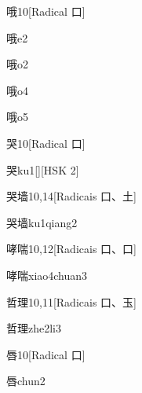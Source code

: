 \begin{entry}{哦}{10}[Radical ⼝]
  \begin{phonetics}{哦}{e2}
  \end{phonetics}
  \begin{phonetics}{哦}{o2}
  \end{phonetics}
  \begin{phonetics}{哦}{o4}
  \end{phonetics}
  \begin{phonetics}{哦}{o5}
  \end{phonetics}
\end{entry}

\begin{entry}{哭}{10}[Radical ⼝]
  \begin{phonetics}{哭}{ku1}[][HSK 2]
  \end{phonetics}
\end{entry}

\begin{entry}{哭墙}{10,14}[Radicais ⼝、⼟]
  \begin{phonetics}{哭墙}{ku1qiang2}
  \end{phonetics}
\end{entry}

\begin{entry}{哮喘}{10,12}[Radicais ⼝、⼝]
  \begin{phonetics}{哮喘}{xiao4chuan3}
  \end{phonetics}
\end{entry}

\begin{entry}{哲理}{10,11}[Radicais ⼝、⽟]
  \begin{phonetics}{哲理}{zhe2li3}
  \end{phonetics}
\end{entry}

\begin{entry}{唇}{10}[Radical ⼝]
  \begin{phonetics}{唇}{chun2}
  \end{phonetics}
\end{entry}

